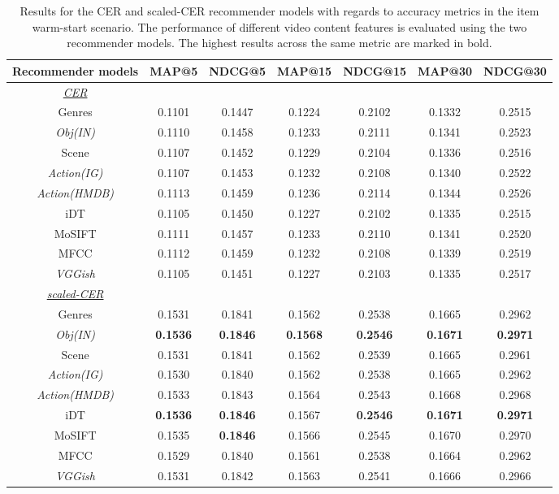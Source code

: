 \documentclass[review]{elsarticle}
\begin{document}
	\begin{table}[H]
\caption{Results for the CER and scaled-CER recommender models with regards to accuracy metrics in the item warm-start scenario. The performance of different video content features is evaluated using the two recommender models. The highest results across the same metric are marked in bold.}
  \label{tab:warmstart_map_ndcg}
  \centering
    \begin{adjustbox}{width=\columnwidth}
    \begin{tabular}{|c|c c c c c c|}
        \cline{1-7}
Recommender models		& MAP@5 	& NDCG@5 	& MAP@15 	& NDCG@15 	& MAP@30 	& NDCG@30 	\\
\midrule
\underline{\textit{CER}} & & & & & & \\
Genres 	&0.1101	&0.1447	&0.1224	&0.2102	&0.1332	&0.2515	\\ 
\textit{Obj(IN)} 	&0.1110	&0.1458	&0.1233	&0.2111	&0.1341	&0.2523	\\
Scene	&0.1107	&0.1452	&0.1229	&0.2104	&0.1336	&0.2516	\\ 
\textit{Action(IG)} 	&0.1107	&0.1453	&0.1232	&0.2108	&0.1340	&0.2522	\\ 
\textit{Action(HMDB)} 	&0.1113	&0.1459	&0.1236	&0.2114	&0.1344	&0.2526	\\ 
iDT 	&0.1105	&0.1450	&0.1227	&0.2102	&0.1335	&0.2515	\\ 
MoSIFT 	&0.1111	&0.1457	&0.1233	&0.2110	&0.1341	&0.2520	\\ 
MFCC 	&0.1112	&0.1459	&0.1232	&0.2108	&0.1339	&0.2519	\\ 
\textit{VGGish} 	&0.1105	&0.1451	&0.1227	&0.2103	&0.1335	&0.2517	\\ 
\midrule
\underline{\textit{scaled-CER}} & & & & & &\\
Genres 	&0.1531	&0.1841	&0.1562	&0.2538	&0.1665	&0.2962	\\ 
\textit{Obj(IN)} 	&\textbf{0.1536}	&\textbf{0.1846}	&\textbf{0.1568}	&\textbf{0.2546}	&\textbf{0.1671}	&\textbf{0.2971}	\\ 
Scene 	&0.1531	&0.1841	&0.1562	&0.2539	&0.1665	&0.2961	\\ 
\textit{Action(IG)} 	&0.1530	&0.1840	&0.1562	&0.2538	&0.1665	&0.2962	\\ 
\textit{Action(HMDB)} 	&0.1533	&0.1843	&0.1564	&0.2543	&0.1668	&0.2968	\\ 
iDT 	&\textbf{0.1536}	&\textbf{0.1846}	&0.1567	&\textbf{0.2546}	&\textbf{0.1671}	&\textbf{0.2971}	\\ 
MoSIFT	&0.1535	&\textbf{0.1846}	&0.1566	&0.2545	&0.1670	&0.2970	\\ 
MFCC 	&0.1529	&0.1840	&0.1561	&0.2538	&0.1664	&0.2962	\\ 
\textit{VGGish} 	&0.1531	&0.1842	&0.1563	&0.2541	&0.1666	&0.2966	\\  \hline
    \end{tabular}
    \end{adjustbox}
\end{table}
\end{document}
